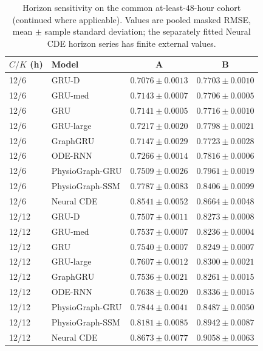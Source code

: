 \clearpage
\begin{table}[tbp]
\centering
\caption{Horizon sensitivity on the common at-least-$48$-hour cohort (continued where applicable). Values are pooled masked RMSE, mean $\pm$ sample standard deviation; the separately fitted Neural CDE horizon series has finite external values.}\label{tab:horizon0}
\small\setlength{\tabcolsep}{4pt}
\begin{tabular}{llcc}
\toprule
$C/K$ (h) 
& Model 
& A 
& B 
\\
\midrule
12/6 
& GRU-D 
& $0.7076\pm0.0013$ 
& $0.7703\pm0.0010$ 
\\
12/6 
& GRU-med 
& $0.7143\pm0.0007$ 
& $0.7706\pm0.0005$ 
\\
12/6 
& GRU 
& $0.7141\pm0.0005$ 
& $0.7716\pm0.0010$ 
\\
12/6 
& GRU-large 
& $0.7217\pm0.0020$ 
& $0.7798\pm0.0021$ 
\\
12/6 
& GraphGRU 
& $0.7147\pm0.0029$ 
& $0.7723\pm0.0028$ 
\\
12/6 
& ODE-RNN 
& $0.7266\pm0.0014$ 
& $0.7816\pm0.0006$ 
\\
12/6 
& PhysioGraph-GRU 
& $0.7509\pm0.0026$ 
& $0.7961\pm0.0019$ 
\\
12/6 
& PhysioGraph-SSM 
& $0.7787\pm0.0083$ 
& $0.8406\pm0.0099$ 
\\
12/6 
& Neural CDE 
& $0.8541\pm0.0052$ 
& $0.8664\pm0.0048$ 
\\
12/12 
& GRU-D 
& $0.7507\pm0.0011$ 
& $0.8273\pm0.0008$ 
\\
12/12 
& GRU-med 
& $0.7537\pm0.0007$ 
& $0.8236\pm0.0004$ 
\\
12/12 
& GRU 
& $0.7540\pm0.0007$ 
& $0.8249\pm0.0007$ 
\\
12/12 
& GRU-large 
& $0.7607\pm0.0012$ 
& $0.8300\pm0.0021$ 
\\
12/12 
& GraphGRU 
& $0.7536\pm0.0021$ 
& $0.8261\pm0.0015$ 
\\
12/12 
& ODE-RNN 
& $0.7638\pm0.0020$ 
& $0.8336\pm0.0015$ 
\\
12/12 
& PhysioGraph-GRU 
& $0.7844\pm0.0041$ 
& $0.8487\pm0.0050$ 
\\
12/12 
& PhysioGraph-SSM 
& $0.8181\pm0.0085$ 
& $0.8942\pm0.0087$ 
\\
12/12 
& Neural CDE 
& $0.8673\pm0.0077$ 
& $0.9058\pm0.0063$ 
\\
\bottomrule
\end{tabular}
\end{table}

